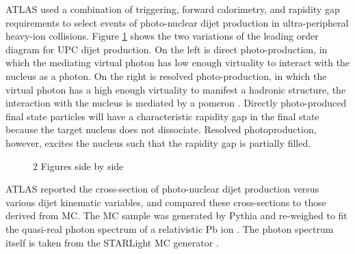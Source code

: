 ATLAS used a combination of triggering, forward calorimetry, and rapidity gap requirements to select events of photo-nuclear dijet production in ultra-peripheral heavy-ion collisions. Figure \ref{fig:exampleDijetAtlas} shows the two variations of the leading order diagram for UPC dijet production. On the left is direct photo-production, in which the mediating virtual photon has low enough virtuality to interact with the nucleus as a photon. On the right is resolved photo-production, in which the virtual photon has a high enough virtuality to manifest a hadronic structure, the interaction with the nucleus is mediated by a pomeron \cite{Donnachie:2002en}. Directly photo-produced final state particles will have a characteristic rapidity gap in the final state because the target nucleus does not dissociate. Resolved photoproduction, however, excites the nucleus such that the rapidity gap is partially filled. 
\begin{figure}%
    \centering
    \qquad
    \caption{2 Figures side by side}%
    \label{fig:exampleDijetAtlas}%
\end{figure}

ATLAS reported the cross-section of photo-nuclear dijet production versus various dijet kinematic variables, and compared these cross-sections to those derived from MC. The MC sample was generated by Pythia and re-weighed to fit the quasi-real photon spectrum of a relativistic Pb ion \cite{pythia}. The photon spectrum itself is taken from the STARLight MC generator \cite{Crittenden:1997yz}\cite{starlight}.
